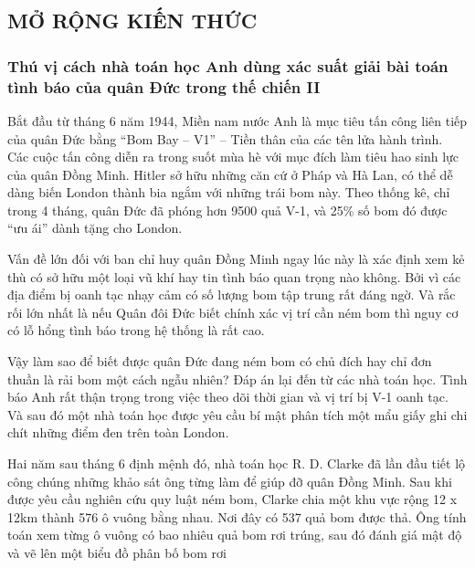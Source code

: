 \subsection{MỞ RỘNG KIẾN THỨC}
\subsubsection*{Thú vị cách nhà toán học Anh dùng xác suất giải bài toán tình báo của quân Đức trong thế chiến II}
Bắt đầu từ tháng 6 năm 1944, Miền nam nước Anh là mục tiêu tấn công liên tiếp của quân Đức bằng “Bom Bay – V1” – Tiền thân của các tên lửa hành trình. Các cuộc tấn công diễn ra trong suốt mùa hè với mục đích làm tiêu hao sinh lực của quân Đồng Minh. Hitler sở hữu những căn cứ ở Pháp và Hà Lan, có thể dễ dàng biến London thành bia ngắm với những trái bom này. Theo thống kê, chỉ trong 4 tháng, quân Đức đã phóng hơn 9500 quả V-1, và 25\% số bom đó được “ưu ái” dành tặng cho London.

Vấn đề lớn đối với ban chỉ huy quân Đồng Minh ngay lúc này là xác định xem kẻ thù có sở hữu một loại vũ khí hay tin tình báo quan trọng nào không. Bởi vì các địa điểm bị oanh tạc nhạy cảm có số lượng bom tập trung rất đáng ngờ. Và rắc rối lớn nhất là nếu Quân đôi Đức biết chính xác vị trí cần ném bom thì nguy cơ có lỗ hổng tình báo trong hệ thống là rất cao.

Vậy làm sao để biết được quân Đức đang ném bom có chủ đích hay chỉ đơn thuần là rải bom một cách ngẫu nhiên? Đáp án lại đến từ các nhà toán học. Tình báo Anh rất thận trọng trong việc theo dõi thời gian và vị trí bị V-1 oanh tạc. Và sau đó một nhà toán học được yêu cầu bí mật phân tích một mẩu giấy ghi chi chít những điểm đen trên toàn London.

Hai năm sau tháng 6 định mệnh đó, nhà toán học  R. D. Clarke đã lần đầu tiết lộ công chúng những khảo sát ông từng làm để giúp đỡ quân Đồng Minh. Sau khi được yêu cầu nghiên cứu quy luật ném bom, Clarke chia một khu vực rộng 12 x 12km  thành 576 ô vuông bằng nhau. Nơi đây có 537 quả bom được thả. Ông tính toán xem từng ô vuông có bao nhiêu quả bom rơi trúng, sau đó đánh giá mật độ và vẽ lên một biểu đồ phân bố bom rơi

